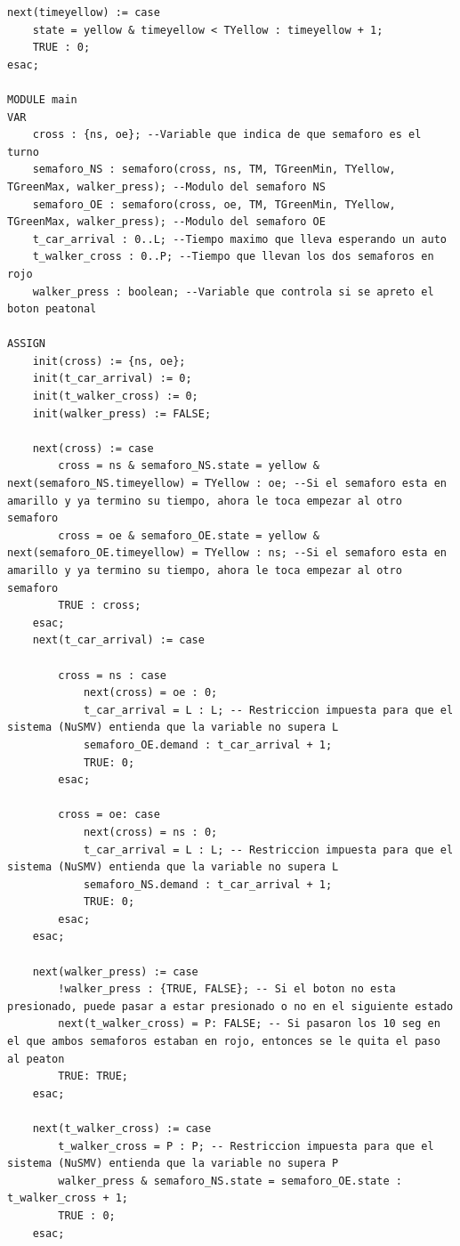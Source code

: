 \begin{lstlisting}[language=NuSMV, caption={Modelo con errores introducidos para violar specs 4 y 5}]
next(timeyellow) := case
    state = yellow & timeyellow < TYellow : timeyellow + 1;
    TRUE : 0;
esac;

MODULE main
VAR
    cross : {ns, oe}; --Variable que indica de que semaforo es el turno
    semaforo_NS : semaforo(cross, ns, TM, TGreenMin, TYellow, TGreenMax, walker_press); --Modulo del semaforo NS
    semaforo_OE : semaforo(cross, oe, TM, TGreenMin, TYellow, TGreenMax, walker_press); --Modulo del semaforo OE
    t_car_arrival : 0..L; --Tiempo maximo que lleva esperando un auto
    t_walker_cross : 0..P; --Tiempo que llevan los dos semaforos en rojo
    walker_press : boolean; --Variable que controla si se apreto el boton peatonal

ASSIGN
    init(cross) := {ns, oe};
    init(t_car_arrival) := 0;
    init(t_walker_cross) := 0;
    init(walker_press) := FALSE;
    
    next(cross) := case
        cross = ns & semaforo_NS.state = yellow & next(semaforo_NS.timeyellow) = TYellow : oe; --Si el semaforo esta en amarillo y ya termino su tiempo, ahora le toca empezar al otro semaforo
        cross = oe & semaforo_OE.state = yellow & next(semaforo_OE.timeyellow) = TYellow : ns; --Si el semaforo esta en amarillo y ya termino su tiempo, ahora le toca empezar al otro semaforo
        TRUE : cross;
    esac;
    next(t_car_arrival) := case
        
        cross = ns : case
            next(cross) = oe : 0;
            t_car_arrival = L : L; -- Restriccion impuesta para que el sistema (NuSMV) entienda que la variable no supera L
            semaforo_OE.demand : t_car_arrival + 1;
            TRUE: 0; 
        esac;
        
        cross = oe: case
            next(cross) = ns : 0;
            t_car_arrival = L : L; -- Restriccion impuesta para que el sistema (NuSMV) entienda que la variable no supera L
            semaforo_NS.demand : t_car_arrival + 1;
            TRUE: 0;
        esac;
    esac;

    next(walker_press) := case
        !walker_press : {TRUE, FALSE}; -- Si el boton no esta presionado, puede pasar a estar presionado o no en el siguiente estado
        next(t_walker_cross) = P: FALSE; -- Si pasaron los 10 seg en el que ambos semaforos estaban en rojo, entonces se le quita el paso al peaton
        TRUE: TRUE;
    esac;

    next(t_walker_cross) := case 
        t_walker_cross = P : P; -- Restriccion impuesta para que el sistema (NuSMV) entienda que la variable no supera P
        walker_press & semaforo_NS.state = semaforo_OE.state : t_walker_cross + 1;
        TRUE : 0;
    esac;
    

\end{lstlisting}
